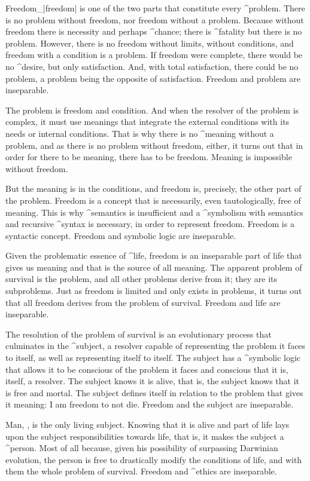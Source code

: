 Freedom_|freedom| is one of the two parts that constitute every
^{problem}. There is no problem without freedom, nor freedom without a
problem. Because without freedom there is necessity and perhaps
^{chance}; there is ^{fatality} but there is no problem. However, there
is no freedom without limits, without conditions, and freedom with a
condition is a problem. If freedom were complete, there would be no
^{desire}, but only satisfaction. And, with total satisfaction, there
could be no problem, a problem being the opposite of satisfaction.
Freedom and problem are inseparable.

The problem is freedom and condition. And when the resolver of the
problem is complex, it must use meanings that integrate the external
conditions with its needs or internal conditions. That is why there is
no ^{meaning} without a problem, and as there is no problem without
freedom, either, it turns out that in order for there to be meaning,
there has to be freedom. Meaning is impossible without freedom.

But the meaning is in the conditions, and freedom is, precisely, the
other part of the problem. Freedom is a concept that is necessarily,
even tautologically, free of meaning. This is why ^{semantics} is
insufficient and a ^{symbolism} with semantics and recursive ^{syntax}
is necessary, in order to represent freedom. Freedom is a syntactic
concept. Freedom and symbolic logic are inseparable.

Given the problematic essence of ^{life}, freedom is an inseparable part
of life that gives us meaning and that is the source of all meaning. The
apparent problem of survival is the problem, and all other problems
derive from it; they are its subproblems. Just as freedom is limited and
only exists in problems, it turns out that all freedom derives from the
problem of survival. Freedom and life are inseparable.

The resolution of the problem of survival is an evolutionary process
that culminates in the ^{subject}, a resolver capable of representing
the problem it faces to itself, as well as representing itself to
itself. The subject has a ^{symbolic logic} that allows it to be
conscious of the problem it faces and conscious that it is, itself, a
resolver. The subject knows it is alive, that is, the subject knows that
it is free and mortal. The subject defines itself in relation to the
problem that gives it meaning: I am freedom to not die. Freedom and the
subject are inseparable.

Man, , is the only living subject. Knowing that it
is alive and part of life lays upon the subject responsibilities towards
life, that is, it makes the subject a ^{person}. Most of all because,
given his possibility of surpassing Darwinian evolution, the person is
free to drastically modify the conditions of life, and with them the
whole problem of survival. Freedom and ^{ethics} are inseparable.



